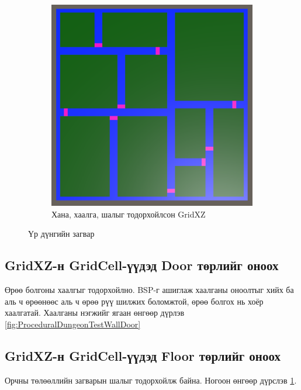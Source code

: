 \begin{figure}[ht]
\begin{subfigure}{\textwidth/2}
		\includegraphics[width=\textwidth-1cm]{./images/ProceduralDungeonTestWallDoorFloor.png}
		\caption{Хана, хаалга, шалыг тодорхойлсон GridXZ}
		\label{fig:ProceduralDungeonTestWallDoorFloor}
	\end{subfigure}
	\caption{Үр дүнгийн загвар}
	\label{fig:Results2}
\end{figure}

\subsection{GridXZ-н GridCell-үүдэд Door төрлийг оноох}
Өрөө болгоны хаалгыг тодорхойлно. BSP-г ашиглаж хаалганы оноолтыг хийх ба аль ч өрөөнөөс аль ч өрөө рүү шилжих боломжтой, өрөө болгох нь хоёр хаалгатай. Хаалганы нэгжийг ягаан өнгөөр дүрлэв \ref{fig:ProceduralDungeonTestWallDoor}
\subsection{GridXZ-н GridCell-үүдэд Floor төрлийг оноох}
Орчны төлөөллийн загварын шалыг тодорхойлж байна. Ногоон өнгөөр дүрслэв \ref{fig:ProceduralDungeonTestWallDoorFloor}.


